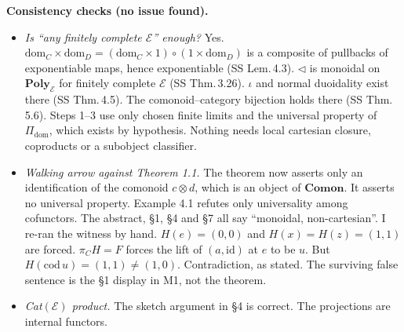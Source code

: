 \documentclass[10pt]{amsart}
\newcommand{\tri}{\mathbin{\triangleleft}}
\newcommand{\Poly}{\mathbf{Poly}}
\newcommand{\Comon}{\mathbf{Comon}}
\newcommand{\E}{\mathcal{E}}
\begin{document}
\textbf{Consistency checks (no issue found).}
\begin{itemize}[leftmargin=*]
\item \emph{Is ``any finitely complete $\E$'' enough?} Yes. $\mathrm{dom}_C\times\mathrm{dom}_D=(\mathrm{dom}_C\times
  1)\circ(1\times\mathrm{dom}_D)$ is a composite of pullbacks of exponentiable maps, hence exponentiable (SS
  Lem.\,4.3). $\tri$ is monoidal on $\Poly_\E$ for finitely complete $\E$ (SS Thm.\,3.26). $\iota$ and normal
  duoidality exist there (SS Thm.\,4.5). The comonoid--category bijection holds there (SS Thm.\,5.6). Steps 1--3 use
  only chosen finite limits and the universal property of $\Pi_{\mathrm{dom}}$, which exists by hypothesis. Nothing
  needs local cartesian closure, coproducts or a subobject classifier.
\item \emph{Walking arrow against Theorem 1.1.} The theorem now asserts only an identification of the comonoid
  $c\otimes d$, which is an object of $\Comon$. It asserts no universal property. Example 4.1 refutes only
  universality among cofunctors. The abstract, \S1, \S4 and \S7 all say ``monoidal, non-cartesian''. I re-ran the
  witness by hand. $H(e)=(0,0)$ and $H(x)=H(z)=(1,1)$ are forced. $\pi_CH=F$ forces the lift of $(a,\mathrm{id})$ at
  $e$ to be $u$. But $H(\mathrm{cod}\,u)=(1,1)\neq(1,0)$. Contradiction, as stated. The surviving false sentence is
  the \S1 display in M1, not the theorem.
\item \emph{Cat$(\E)$ product.} The sketch argument in \S4 is correct. The projections are internal functors.
\end{itemize}
\end{document}
